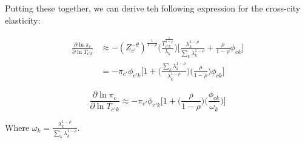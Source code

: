 \documentclass[10pt]{article}
\begin{document}
Putting these together, we can derive teh following expression for the cross-city elasticity:

\begin{align*}
    \frac{\partial\ln{\pi_{c}}}{\partial\ln{T_{{c'}k}}} & \approx - (Z_{c'}^{-\theta})^{\frac{1}{1-\rho}}\Bigg(\frac{T_{{c'}k}^{\frac{1}{1-\rho}}}{\lambda_{k}}\Bigg)\Bigg[\frac{\lambda_{k}^{1-\rho}}{\sum\limits_{k}{\lambda_{k}^{1-\rho}}} + \frac{\rho}{1-\rho}\phi_{ck}\Bigg] \\ &= -{\pi_{c'}}{\phi_{{c'}k}}\Bigg[1+\Bigg(\frac{\sum\limits_{k}{\lambda_{k}^{1-\rho}}}{\lambda_{k}^{1-\rho}}\Bigg)\Bigg(\frac{\rho}{1-\rho}\Bigg)\phi_{ck}\Bigg]
\end{align*}

\begin{equation*}
    \frac{\partial\ln{\pi_{c}}}{\partial\ln{T_{{c'}k}}} \approx -{\pi_{c'}}{\phi_{{c'}k}}\Big[1+\Big(\frac{\rho}{1-\rho}\Big)\Big(\frac{\phi_{ck}}{\omega_{k}}\Big)\Big]
\end{equation*}

Where $\omega_k = \frac{\lambda_k^{1 - \rho}}{\sum_{k}^{} \lambda_k^{1 - \rho}}$.
\end{document}

